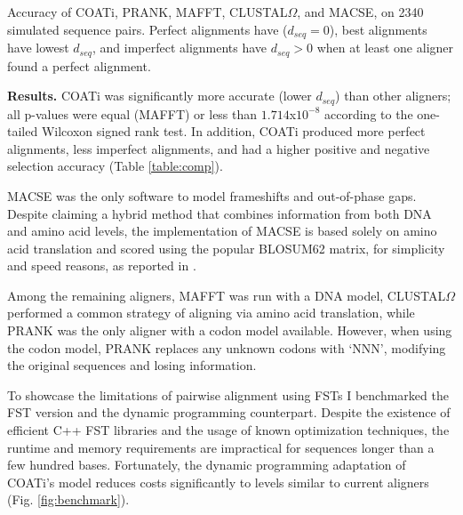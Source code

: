 \begin{table}[h!]
\centering
    \frame{}
	\caption{Accuracy of COATi, PRANK, MAFFT, CLUSTAL$\Omega$, and MACSE,
            on 2340 simulated sequence pairs. Perfect alignments have
            ($d_{seq}=0$), best alignments have lowest $d_{seq}$, and imperfect
            alignments have $d_{seq}>0$ when at least one aligner found a
            perfect alignment.}
	\label{table:comp}
\end{table}

\textbf{Results.}
COATi was significantly more accurate (lower $d_{seq}$) than other aligners; all
p-values were equal (MAFFT) or less than $1.714$x$10^{-8}$ according to the one-tailed
Wilcoxon signed rank test.
In addition, COATi produced more perfect alignments, less imperfect alignments,
and had a higher positive and negative selection accuracy
(Table \ref{table:comp}).

MACSE was the only software to model frameshifts and out-of-phase gaps.
Despite claiming a hybrid method that combines information from both DNA and
amino acid levels, the implementation of MACSE is based solely on amino acid
translation and scored using the popular BLOSUM62 \parencite{henikoff1992amino}
matrix, for simplicity and speed reasons, as reported in
\cite{ranwez_macse_2011}.

Among the remaining aligners, MAFFT was run with a DNA model, CLUSTAL$\Omega$
performed a common strategy of aligning via amino acid translation, while PRANK
was the only aligner with a codon model available.
However, when using the codon model, PRANK replaces any unknown codons with
`NNN', modifying the original sequences and losing information.


To showcase the limitations of pairwise alignment using FSTs I benchmarked
the FST version and the dynamic programming counterpart.
Despite the existence of efficient C++ FST libraries and the usage of known
optimization techniques, the runtime and memory requirements are impractical
for sequences longer than a few hundred bases.
Fortunately, the dynamic programming adaptation of COATi's model
reduces costs significantly to levels similar to current aligners
(Fig. \ref{fig:benchmark}).

